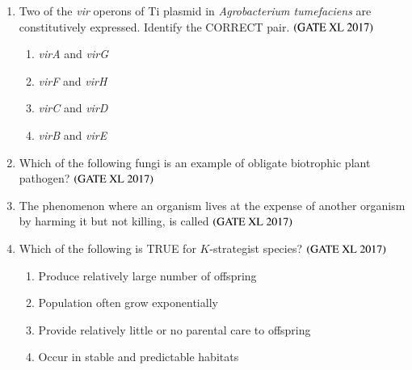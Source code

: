\documentclass[journal]{IEEEtran}
\begin{document}
\begin{enumerate}
\item Two of the \textit{vir} operons of Ti plasmid in \textit{Agrobacterium tumefaciens} are constitutively expressed. Identify the CORRECT pair. \hfill $\left(\text{GATE XL 2017}\right)$
\begin{enumerate}
    \item \textit{virA} and \textit{virG}
    \item \textit{virF} and \textit{virH}
    \item \textit{virC} and \textit{virD}
    \item \textit{virB} and \textit{virE}
\end{enumerate}

\item Which of the following fungi is an example of obligate biotrophic plant pathogen? \hfill $\left(\text{GATE XL 2017}\right)$
\begin{enumerate}
\end{enumerate}

\item The phenomenon where an organism lives at the expense of another organism by harming it but not killing, is called \hfill $\left(\text{GATE XL 2017}\right)$
\begin{enumerate}
\end{enumerate}

\item Which of the following is TRUE for $K$-strategist species? \hfill $\left(\text{GATE XL 2017}\right)$
\begin{enumerate}
    \item Produce relatively large number of offspring
    \item Population often grow exponentially
    \item Provide relatively little or no parental care to offspring
    \item Occur in stable and predictable habitats
\end{enumerate}


\end{enumerate}
\end{document}
